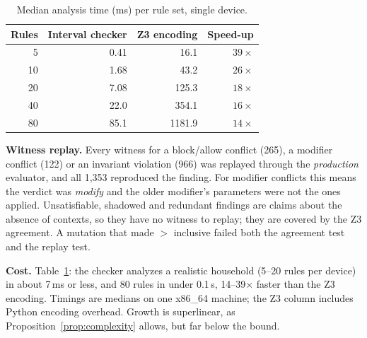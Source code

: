 \documentclass[conference]{IEEEtran}
\theoremstyle{definition}
\begin{document}
\begin{table}[t]
\centering
\caption{Median analysis time (ms) per rule set, single device.}
\label{tab:time}
\begin{tabular}{rrrr}
\toprule
Rules & Interval checker & Z3 encoding & Speed-up\\
\midrule
5 & 0.41 & 16.1 & $39\times$\\
10 & 1.68 & 43.2 & $26\times$\\
20 & 7.08 & 125.3 & $18\times$\\
40 & 22.0 & 354.1 & $16\times$\\
80 & 85.1 & 1181.9 & $14\times$\\
\bottomrule
\end{tabular}
\end{table}

\textbf{Witness replay.} Every witness for a block/allow conflict (265), a modifier conflict (122) or an invariant violation (966) was replayed through the \emph{production} evaluator, and all 1{,}353 reproduced the finding. For modifier conflicts this means the verdict was \emph{modify} and the older modifier's parameters were not the ones applied. Unsatisfiable, shadowed and redundant findings are claims about the absence of contexts, so they have no witness to replay; they are covered by the Z3 agreement. A mutation that made $>$ inclusive failed both the agreement test and the replay test.


\textbf{Cost.} Table~\ref{tab:time}: the checker analyzes a realistic household (5--20 rules per device) in about 7\,ms or less, and 80 rules in under 0.1\,s, 14--39$\times$ faster than the Z3 encoding. Timings are medians on one x86\_64 machine; the Z3 column includes Python encoding overhead. Growth is superlinear, as Proposition~\ref{prop:complexity} allows, but far below the bound.
\end{document}
